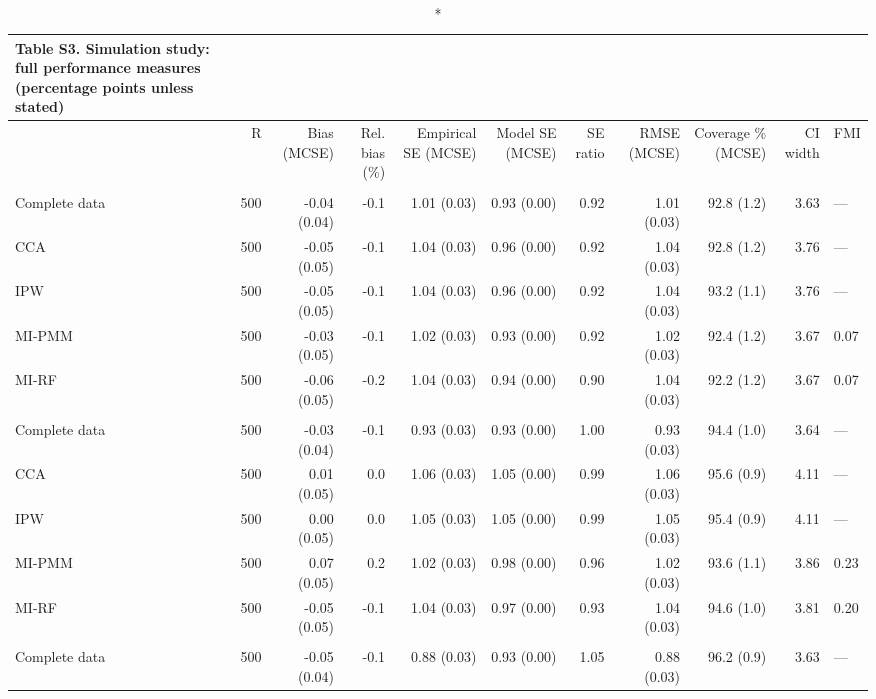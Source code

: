 \begingroup
\fontsize{8.0pt}{10.0pt}\selectfont
\begin{longtable}{l|rrrrrrrrrl}
\caption*{
{\fontsize{20}{25}\selectfont  Table S3. Simulation study: full performance measures (percentage points unless stated)\fontsize{8}{10}\selectfont }
} \\ 
\toprule
 & R & Bias (MCSE) & Rel. bias (\%) & Empirical SE (MCSE) & Model SE (MCSE) & SE ratio & RMSE (MCSE) & Coverage \% (MCSE) & CI width & FMI \\ 
\midrule\endhead\addlinespace[2.5pt]
\multicolumn{11}{l}{Stunting — MCAR 10\%} \\[2.5pt] 
\midrule\addlinespace[2.5pt]
Complete data & 500 & -0.04 (0.04) & -0.1 & 1.01 (0.03) & 0.93 (0.00) & 0.92 & 1.01 (0.03) & 92.8 (1.2) & 3.63 & — \\ 
CCA & 500 & -0.05 (0.05) & -0.1 & 1.04 (0.03) & 0.96 (0.00) & 0.92 & 1.04 (0.03) & 92.8 (1.2) & 3.76 & — \\ 
IPW & 500 & -0.05 (0.05) & -0.1 & 1.04 (0.03) & 0.96 (0.00) & 0.92 & 1.04 (0.03) & 93.2 (1.1) & 3.76 & — \\ 
MI-PMM & 500 & -0.03 (0.05) & -0.1 & 1.02 (0.03) & 0.93 (0.00) & 0.92 & 1.02 (0.03) & 92.4 (1.2) & 3.67 & 0.07 \\ 
MI-RF & 500 & -0.06 (0.05) & -0.2 & 1.04 (0.03) & 0.94 (0.00) & 0.90 & 1.04 (0.03) & 92.2 (1.2) & 3.67 & 0.07 \\ 
\midrule\addlinespace[2.5pt]
\multicolumn{11}{l}{Stunting — MCAR 30\%} \\[2.5pt] 
\midrule\addlinespace[2.5pt]
Complete data & 500 & -0.03 (0.04) & -0.1 & 0.93 (0.03) & 0.93 (0.00) & 1.00 & 0.93 (0.03) & 94.4 (1.0) & 3.64 & — \\ 
CCA & 500 & 0.01 (0.05) & 0.0 & 1.06 (0.03) & 1.05 (0.00) & 0.99 & 1.06 (0.03) & 95.6 (0.9) & 4.11 & — \\ 
IPW & 500 & 0.00 (0.05) & 0.0 & 1.05 (0.03) & 1.05 (0.00) & 0.99 & 1.05 (0.03) & 95.4 (0.9) & 4.11 & — \\ 
MI-PMM & 500 & 0.07 (0.05) & 0.2 & 1.02 (0.03) & 0.98 (0.00) & 0.96 & 1.02 (0.03) & 93.6 (1.1) & 3.86 & 0.23 \\ 
MI-RF & 500 & -0.05 (0.05) & -0.1 & 1.04 (0.03) & 0.97 (0.00) & 0.93 & 1.04 (0.03) & 94.6 (1.0) & 3.81 & 0.20 \\ 
\midrule\addlinespace[2.5pt]
\multicolumn{11}{l}{Stunting — MCAR 50\%} \\[2.5pt] 
\midrule\addlinespace[2.5pt]
Complete data & 500 & -0.05 (0.04) & -0.1 & 0.88 (0.03) & 0.93 (0.00) & 1.05 & 0.88 (0.03) & 96.2 (0.9) & 3.63 & — \\ 

\end{longtable}
